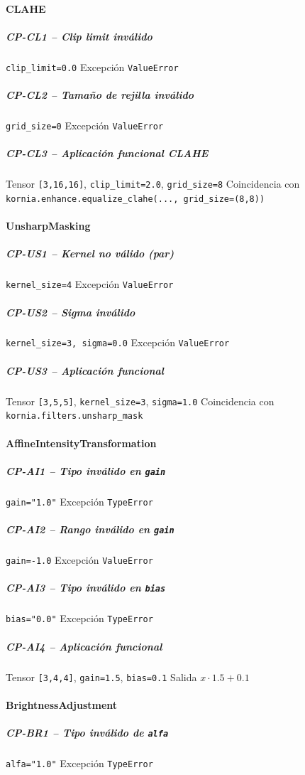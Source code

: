 \paragraph{CLAHE}
\subparagraph{CP-CL1 -- \textit{Clip limit} inválido}\label{cp:CP-CL1}
\testcasetable
{\texttt{clip\_limit=0.0}}
{Excepción \texttt{ValueError}}

\subparagraph{CP-CL2 -- Tamaño de rejilla inválido}\label{cp:CP-CL2}
\testcasetable
{\texttt{grid\_size=0}}
{Excepción \texttt{ValueError}}

\subparagraph{CP-CL3 -- Aplicación funcional CLAHE}\label{cp:CP-CL3}
\testcasetable
{Tensor \texttt{[3,16,16]}, \texttt{clip\_limit=2.0}, \texttt{grid\_size=8}}
{Coincidencia con \texttt{kornia.enhance.equalize\_clahe(..., grid\_size=(8,8))}}

\paragraph{UnsharpMasking}
\subparagraph{CP-US1 -- Kernel no válido (par)}\label{cp:CP-US1}
\testcasetable
{\texttt{kernel\_size=4}}
{Excepción \texttt{ValueError}}

\subparagraph{CP-US2 -- Sigma inválido}\label{cp:CP-US2}
\testcasetable
{\texttt{kernel\_size=3, sigma=0.0}}
{Excepción \texttt{ValueError}}

\subparagraph{CP-US3 -- Aplicación funcional}\label{cp:CP-US3}
\testcasetable
{Tensor \texttt{[3,5,5]}, \texttt{kernel\_size=3}, \texttt{sigma=1.0}}
{Coincidencia con \texttt{kornia.filters.unsharp\_mask}}

\paragraph{AffineIntensityTransformation}
\subparagraph{CP-AI1 -- Tipo inválido en \texttt{gain}}\label{cp:CP-AI1}
\testcasetable
{\texttt{gain="1.0"}}
{Excepción \texttt{TypeError}}

\subparagraph{CP-AI2 -- Rango inválido en \texttt{gain}}\label{cp:CP-AI2}
\testcasetable
{\texttt{gain=-1.0}}
{Excepción \texttt{ValueError}}

\subparagraph{CP-AI3 -- Tipo inválido en \texttt{bias}}\label{cp:CP-AI3}
\testcasetable
{\texttt{bias="0.0"}}
{Excepción \texttt{TypeError}}

\subparagraph{CP-AI4 -- Aplicación funcional}\label{cp:CP-AI4}
\testcasetable
{Tensor \texttt{[3,4,4]}, \texttt{gain=1.5}, \texttt{bias=0.1}}
{Salida $x\cdot 1.5 + 0.1$}

\paragraph{BrightnessAdjustment}
\subparagraph{CP-BR1 -- Tipo inválido de \texttt{alfa}}\label{cp:CP-BR1}
\testcasetable
{\texttt{alfa="1.0"}}
{Excepción \texttt{TypeError}}

